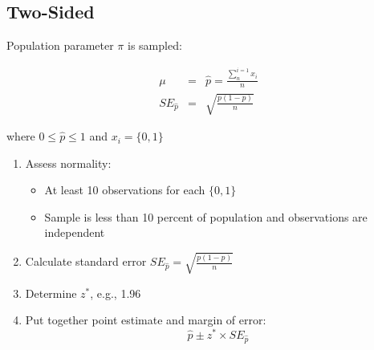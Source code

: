 
\subsection*{Two-Sided}

\hformbar




Population parameter $\pi$ is sampled:

\begin{eqnarray}
  \mu       &=& \hat{p} = \frac{\sum_n^{i=1} x_{i}}{n} \\
  SE_{\hat{p}}  &=& \sqrt{\frac{p(1-p)}{n}}
\end{eqnarray}

where $0 \leq \hat{p} \leq 1$ and $x_i = \{0, 1\}$
\hformbar




\begin{enumerate}
	\item Assess normality:
		\begin{itemize}
			\item At least 10 observations for each $\{0, 1\}$
			\item Sample is less than 10 percent of population and observations are independent
		\end{itemize}
	\item Calculate standard error $SE_{\hat{p}} = \sqrt{\frac{p(1-p)}{n}}$
	\item Determine $z^*$, e.g., 1.96
	\item Put together point estimate and margin of error:
	\begin{equation}
		\hat{p} \pm z^* \times SE_{\hat{p}}
	\end{equation}
\end{enumerate}

\hformbar



